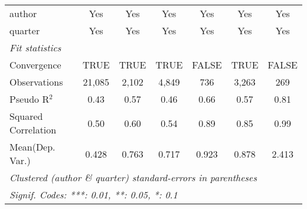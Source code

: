 \begin{tabular}{lcccccc}
   author                                                     & Yes           & Yes           & Yes         & Yes           & Yes           & Yes\\  
   quarter                                                    & Yes           & Yes           & Yes         & Yes           & Yes           & Yes\\  
   \midrule
   \emph{Fit statistics}\\
   Convergence                                                &TRUE           & TRUE          & TRUE        & FALSE         & TRUE          & FALSE\\  
   Observations                                               & 21,085        & 2,102         & 4,849       & 736           & 3,263         & 269\\  
   Pseudo R$^2$                                               & 0.43          & 0.57          & 0.46        & 0.66          & 0.57          & 0.81\\  
   Squared Correlation                                        & 0.50          & 0.60          & 0.54        & 0.89          & 0.85          & 0.99\\  
Mean(Dep. Var.) & 0.428 & 0.763 & 0.717 & 0.923 & 0.878 & 2.413 \\
   \midrule \midrule
   \multicolumn{7}{l}{\emph{Clustered (author \& quarter) standard-errors in parentheses}}\\
   \multicolumn{7}{l}{\emph{Signif. Codes: ***: 0.01, **: 0.05, *: 0.1}}\\
\end{tabular}
\par\endgroup
